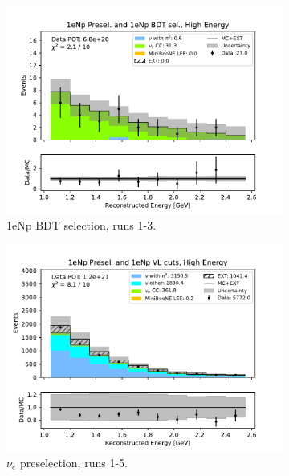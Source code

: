 \begin{figure}[H]
\begin{subfigure}{0.33\linewidth}
    \includegraphics[width=\linewidth]{technote/Sidebands/Figures/FarSideband/far_sideband_reco_e_run123_NP_NPBDT_HIGH_ENERGY.pdf}
    \caption{1eNp BDT selection, runs 1-3.}
    \end{subfigure}
    \begin{subfigure}{0.33\linewidth}
    \includegraphics[width=\linewidth]{technote/Sidebands/Figures/FarSideband/far_sideband_reco_e_run1234a4b4c4d5_NP_NP_HIGH_ENERGY.pdf}
    \caption{$\nu_e$ preselection, runs 1-5.}
    \end{subfigure}%
    \begin{subfigure}{0.33\linewidth}

\end{subfigure}
\end{figure}
